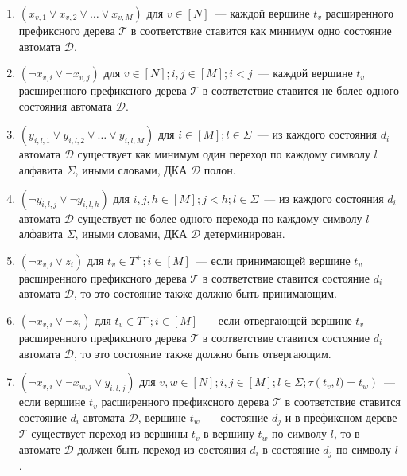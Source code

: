 \begin{enumerate}
  \item $\left(x_{v,1} \vee x_{v,2} \vee \ldots \vee x_{v,M}\right)$ для $v \in \left[N\right]$~{---} каждой вершине $t_{v}$ расширенного префиксного дерева $\mathcal{T} $ в соответствие ставится как минимум одно состояние автомата $\mathcal{D}$.
  \item $\left(\neg x_{v,i} \vee \neg x_{v,j}\right)$ для $v \in \left[N\right]; i,j \in \left[M\right]; i < j$~{---} каждой вершине $t_{v}$ расширенного префиксного дерева $\mathcal{T} $ в соответствие ставится не более одного состояния автомата $\mathcal{D}$.
  \item $\left(y_{i,l,1} \vee y_{i,l,2} \vee \ldots \vee y_{i,l,M}\right)$ для $i \in \left[M\right]; l \in \Sigma$~{---} из каждого состояния $d_{i}$ автомата $\mathcal{D}$ существует как минимум один переход по каждому символу $l$ алфавита $\Sigma$, иными словами, ДКА $\mathcal{D}$ полон.
  \item $\left(\neg y_{i,l,j} \vee \neg y_{i,l,h}\right)$ для $i,j,h \in \left[M\right]; j < h; l \in \Sigma$~{---} из каждого состояния $d_{i}$ автомата $\mathcal{D}$ существует не более одного перехода по каждому символу $l$ алфавита $\Sigma$, иными словами, ДКА $\mathcal{D}$ детерминирован.
  \item $\left(\neg x_{v,i} \vee z_{i}\right)$ для $t_{v} \in T^{+}; i \in \left[M\right]$~{---} если принимающей вершине $t_{v}$ расширенного префиксного дерева $\mathcal{T}$ в соответствие ставится состояние $d_{i}$ автомата $\mathcal{D}$, то это состояние также должно быть принимающим.
  \item $\left(\neg x_{v,i} \vee \neg z_{i}\right)$ для $t_{v} \in T^{-}; i \in \left[M\right]$~{---} если отвергающей вершине $t_{v}$ расширенного префиксного дерева $\mathcal{T}$ в соответствие ставится состояние $d_{i}$ автомата $\mathcal{D}$, то это состояние также должно быть отвергающим.
  \item $\left(\neg x_{v,i} \vee \neg x_{w,j} \vee y_{i,l,j}\right)$ для $v,w \in \left[N\right]; i,j \in \left[M\right];l \in \Sigma; \tau\left(t_{v},l) = t_{w}\right)$~{---} если вершине $t_{v}$ расширенного префиксного дерева $\mathcal{T} $ в соответствие ставится состояние $d_{i}$ автомата $\mathcal{D}$, вершине $t_{w}$~{---} состояние $d_{j}$ и в префиксном дереве $\mathcal{T}$ существует переход из вершины $t_{v}$ в вершину $t_{w}$ по символу $l$, то в автомате $\mathcal{D}$ должен быть переход из состояния $d_{i}$ в состояние $d_{j}$ по символу $l$.

\end{enumerate}
